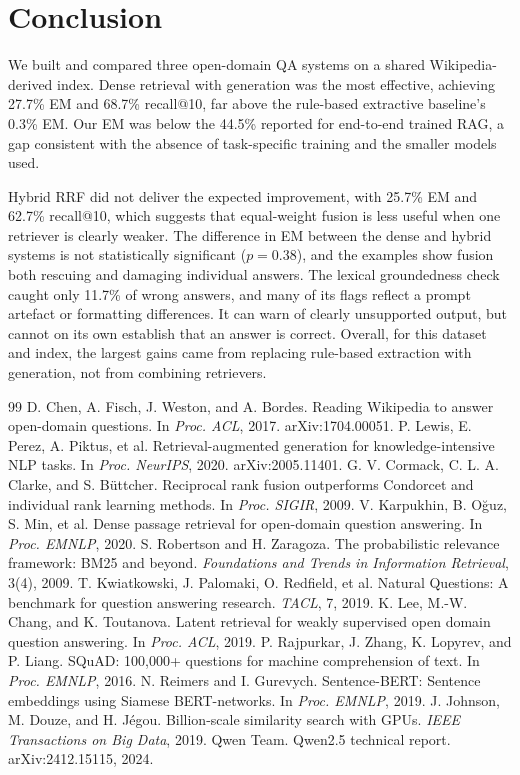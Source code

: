 \documentclass[11pt,a4paper]{article}
\begin{document}
\section{Conclusion}

We built and compared three open-domain QA systems on a shared Wikipedia-derived index. Dense retrieval with generation was the most effective, achieving 27.7\% EM and 68.7\% recall@10, far above the rule-based extractive baseline's 0.3\% EM. Our EM was below the 44.5\% reported for end-to-end trained RAG, a gap consistent with the absence of task-specific training and the smaller models used.

Hybrid RRF did not deliver the expected improvement, with 25.7\% EM and 62.7\% recall@10, which suggests that equal-weight fusion is less useful when one retriever is clearly weaker. The difference in EM between the dense and hybrid systems is not statistically significant ($p=0.38$), and the examples show fusion both rescuing and damaging individual answers. The lexical groundedness check caught only 11.7\% of wrong answers, and many of its flags reflect a prompt artefact or formatting differences. It can warn of clearly unsupported output, but cannot on its own establish that an answer is correct. Overall, for this dataset and index, the largest gains came from replacing rule-based extraction with generation, not from combining retrievers.

\begin{thebibliography}{99}
 D. Chen, A. Fisch, J. Weston, and A. Bordes. Reading Wikipedia to answer open-domain questions. In \emph{Proc. ACL}, 2017. arXiv:1704.00051.
 P. Lewis, E. Perez, A. Piktus, et al. Retrieval-augmented generation for knowledge-intensive NLP tasks. In \emph{Proc. NeurIPS}, 2020. arXiv:2005.11401.
 G. V. Cormack, C. L. A. Clarke, and S. B\"uttcher. Reciprocal rank fusion outperforms Condorcet and individual rank learning methods. In \emph{Proc. SIGIR}, 2009.
 V. Karpukhin, B. O\u{g}uz, S. Min, et al. Dense passage retrieval for open-domain question answering. In \emph{Proc. EMNLP}, 2020.
 S. Robertson and H. Zaragoza. The probabilistic relevance framework: BM25 and beyond. \emph{Foundations and Trends in Information Retrieval}, 3(4), 2009.
 T. Kwiatkowski, J. Palomaki, O. Redfield, et al. Natural Questions: A benchmark for question answering research. \emph{TACL}, 7, 2019.
 K. Lee, M.-W. Chang, and K. Toutanova. Latent retrieval for weakly supervised open domain question answering. In \emph{Proc. ACL}, 2019.
 P. Rajpurkar, J. Zhang, K. Lopyrev, and P. Liang. SQuAD: 100,000+ questions for machine comprehension of text. In \emph{Proc. EMNLP}, 2016.
 N. Reimers and I. Gurevych. Sentence-BERT: Sentence embeddings using Siamese BERT-networks. In \emph{Proc. EMNLP}, 2019.
 J. Johnson, M. Douze, and H. J\'egou. Billion-scale similarity search with GPUs. \emph{IEEE Transactions on Big Data}, 2019.
 Qwen Team. Qwen2.5 technical report. arXiv:2412.15115, 2024.
\end{thebibliography}
\end{document}
